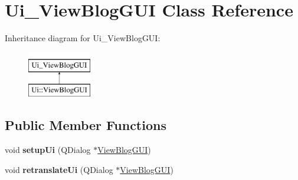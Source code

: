 \hypertarget{classUi__ViewBlogGUI}{}\section{Ui\+\_\+\+View\+Blog\+G\+UI Class Reference}
\label{classUi__ViewBlogGUI}
Inheritance diagram for Ui\+\_\+\+View\+Blog\+G\+UI\+:\begin{figure}[H]
\begin{center}
\leavevmode
\includegraphics[height=2.000000cm]{classUi__ViewBlogGUI}
\end{center}
\end{figure}
\subsection*{Public Member Functions}
\begin{DoxyCompactItemize}
\item 
void {\bfseries setup\+Ui} (Q\+Dialog $\ast$\hyperlink{classViewBlogGUI}{View\+Blog\+G\+UI})\hypertarget{classUi__ViewBlogGUI_a7a16fbfa79cf84726fd36d8c3289f2c8}{}\label{classUi__ViewBlogGUI_a7a16fbfa79cf84726fd36d8c3289f2c8}

\item 
void {\bfseries retranslate\+Ui} (Q\+Dialog $\ast$\hyperlink{classViewBlogGUI}{View\+Blog\+G\+UI})\hypertarget{classUi__ViewBlogGUI_a86811f7015d1ad92c10be64ba0c7de66}{}\label{classUi__ViewBlogGUI_a86811f7015d1ad92c10be64ba0c7de66}

\end{DoxyCompactItemize}
